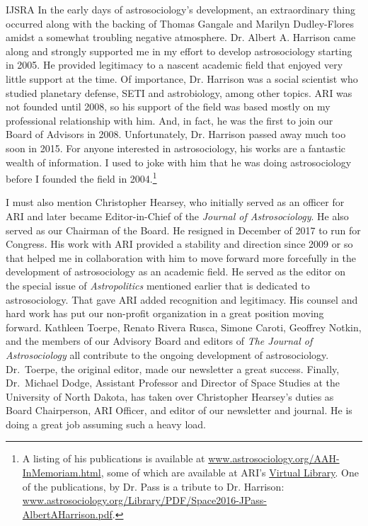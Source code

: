 \begin{labeling}{IJSRA}
	In the early days of astrosociology’s development, an extraordinary thing occurred along with the backing of Thomas Gangale and Marilyn Dudley-Flores amidst a somewhat troubling negative atmosphere. Dr. Albert A. Harrison came along and strongly supported me in my effort to develop astrosociology starting in 2005. He provided legitimacy to a nascent academic field that enjoyed very little support at the time. Of importance, Dr. Harrison was a social scientist who studied planetary defense, SETI and astrobiology, among other topics. ARI was not founded until 2008, so his support of the field was based mostly on my professional relationship with him. And, in fact, he was the first to join our Board of Advisors in 2008. Unfortunately, Dr. Harrison passed away much too soon in 2015. For anyone interested in astrosociology, his works are a fantastic wealth of information. I used to joke with him that he was doing astrosociology before I founded the field in 2004.\footnote{A listing of his publications is available at \href{http://www.astrosociology.org/AAH-InMemoriam.html}{www.astrosociology.org/AAH-InMemoriam.html}, some of which are available at ARI’s \href{<www.astrosociology.org/vlibrary.html>}{Virtual Library}. One of the publications, by Dr. Pass is a tribute to Dr. Harrison: \href{<http://www.astrosociology.org/Library/PDF/Space2016-JPass-AlbertAHarrison.pdf>}{www.astrosociology.org/Library/PDF/Space2016-JPass-AlbertAHarrison.pdf}.}

	I must also mention Christopher Hearsey, who initially served as an officer for ARI and later became Editor-in-Chief of the \emph{Journal of Astrosociology}. He also served as our Chairman of the Board. He resigned in December of 2017 to run for Congress. His work with ARI provided a stability and direction since 2009 or so that helped me in collaboration with him to move forward more forcefully in the development of astrosociology as an academic field. He served as the editor on the special issue of \emph{Astropolitics} mentioned earlier that is dedicated to astrosociology. That gave ARI added recognition and legitimacy. His counsel and hard work has put our non-profit organization in a great position moving forward. Kathleen Toerpe, Renato Rivera Rusca, Simone Caroti, Geoffrey Notkin, and the members of our Advisory Board and editors of \emph{The Journal of Astrosociology} all contribute to the ongoing development of astrosociology. Dr.~Toerpe, the original editor, made our newsletter a great success. Finally, Dr.~Michael Dodge, Assistant Professor and Director of Space Studies at the University of North Dakota, has taken over Christopher Hearsey’s duties as Board Chairperson, ARI Officer, and editor of our newsletter and journal. He is doing a great job assuming such a heavy load.


\end{labeling}
